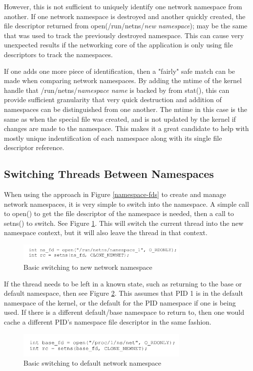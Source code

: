 \documentclass[letterpaper]{article}
\begin{document}
However, this is not sufficient to uniquely identify one network namespace from another. If one network namespace is destroyed and another quickly created, the file descriptor returned from open(/run/netns/\textit{new namespace}); may be the same that was used to track the previously destroyed namespace. This can cause very unexpected results if the networking core of the application is only using file descriptors to track the namespaces.

If one adds one more piece of identification, then a "fairly" safe match can be made when comparing network namespaces. By adding the mtime of the kernel handle that /run/netns/\textit{namespace name} is backed by from stat(), this can provide sufficient granularity that very quick destruction and addition of namespaces can be distinguished from one another. The mtime in this case is the same as when the special file was created, and is not updated by the kernel if changes are made to the namespace. This makes it a great candidate to help with mostly unique indentification of each namespace along with its single file descriptor reference.

\subsection{Switching Threads Between Namespaces}
When using the approach in Figure \ref{namespace-fds} to create and manage network namespaces, it is very simple to switch into the namespace. A simple call to open() to get the file descriptor of the namespace is needed, then a call to setns() to switch. See Figure \ref{switch-new-namespace}. This will switch the current thread into the new namespace context, but it will also leave the thread in that context.
\begin{figure}[h]
\includegraphics[width=3.31in]{switch-new-namespace.png}
\caption{Basic switching to new network namespace}
\label{switch-new-namespace}
\end{figure}

If the thread needs to be left in a known state, such as returning to the base or default namespace, then see Figure \ref{switch-base-namespace}. This assumes that PID 1 is in the default namespace of the kernel, or the default for the PID namespace if one is being used. If there is a different default/base namespace to return to, then one would cache a different PID's namespace file descriptor in the same fashion.
\begin{figure}[h]
\includegraphics[width=3.31in]{switch-base-namespace.png}
\caption{Basic switching to default network namespace}
\label{switch-base-namespace}
\end{figure}
\end{document}
